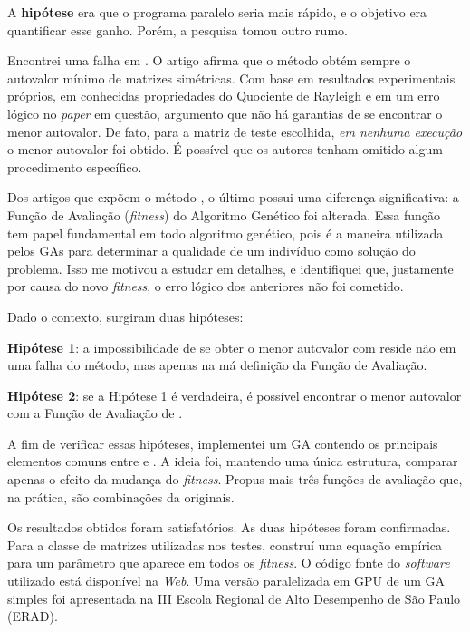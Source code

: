 	A \textbf{hipótese} era que o programa paralelo seria mais rápido, e o objetivo era quantificar esse ganho. Porém, a pesquisa tomou outro rumo.
	
	Encontrei uma falha em \cite{metodo2004}. O artigo afirma que o método obtém sempre o autovalor mínimo de matrizes simétricas. Com base em resultados experimentais próprios, em conhecidas propriedades do Quociente de Rayleigh e em um erro lógico no \emph{paper} em questão, argumento que não há garantias de se encontrar o menor autovalor. De fato, para a matriz de teste escolhida, \emph{em nenhuma execução} o menor autovalor foi obtido. É possível que os autores tenham omitido algum procedimento específico.
	
	Dos artigos que expõem o método \cite{metodo2004, metodo2006, metodo2008, metodo2009, metodo2011}, o último possui uma diferença significativa: a Função de Avaliação (\emph{fitness}) do Algoritmo Genético foi alterada. Essa função tem papel fundamental em todo algoritmo genético, pois é a maneira utilizada pelos GAs para determinar a qualidade de um indivíduo como solução do problema. Isso me motivou a estudar \cite{metodo2011} em detalhes, e identifiquei que, justamente por causa do novo \emph{fitness}, o erro lógico dos anteriores não foi cometido.
	
	Dado o contexto, surgiram duas hipóteses:
	
	\textbf{Hipótese 1}: a impossibilidade de se obter o menor autovalor com \cite{metodo2004} reside não em uma falha do método, mas apenas na má definição da Função de Avaliação.
	
	\textbf{Hipótese 2}: se a Hipótese 1 é verdadeira, é possível encontrar o menor autovalor com a Função de Avaliação de \cite{metodo2011}.
		
	A fim de verificar essas hipóteses, implementei um GA contendo os principais elementos comuns entre \cite{metodo2004} e \cite{metodo2011}. A ideia foi, mantendo uma única estrutura, comparar apenas o efeito da mudança do \emph{fitness}. Propus mais três funções de avaliação que, na prática, são combinações da originais.
	
	Os resultados obtidos foram satisfatórios. As duas hipóteses foram confirmadas. Para a classe de matrizes utilizadas nos testes, construí uma equação empírica para um parâmetro que aparece em todos os \emph{fitness}. O código fonte do \emph{software} utilizado está disponível na \emph{Web}. Uma versão paralelizada em GPU de um GA simples foi apresentada na III Escola Regional de Alto Desempenho de São Paulo (ERAD).